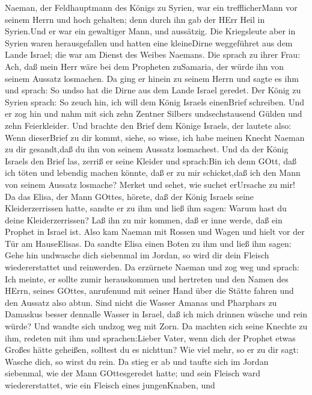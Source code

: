  Naeman, der Feldhauptmann des Königs zu Syrien, war ein
trefflicherMann vor seinem Herrn und hoch gehalten; denn durch ihn gab
der HErr Heil in Syrien.Und er war ein gewaltiger Mann, und aussätzig.
 Die Kriegsleute aber in Syrien waren herausgefallen und
hatten eine kleineDirne weggeführet aus dem Lande Israel; die war am
Dienst des Weibes Naemans.  Die sprach zu ihrer Frau: Ach,
daß mein Herr wäre bei dem Propheten zuSamaria, der würde ihn von seinem
Aussatz losmachen.  Da ging er hinein zu seinem Herrn und
sagte es ihm und sprach: So undso hat die Dirne aus dem Lande Israel
geredet.  Der König zu Syrien sprach: So zeuch hin, ich will
dem König Israels einenBrief schreiben. Und er zog hin und nahm mit sich
zehn Zentner Silbers undsechstausend Gülden und zehn Feierkleider.
 Und brachte den Brief dem Könige Israels, der lautete also:
Wenn dieserBrief zu dir kommt, siehe, so wisse, ich habe meinen Knecht
Naeman zu dir gesandt,daß du ihn von seinem Aussatz losmachest.
 Und da der König Israels den Brief las, zerriß er seine
Kleider und sprach:Bin ich denn GOtt, daß ich töten und lebendig machen
könnte, daß er zu mir schicket,daß ich den Mann von seinem Aussatz
losmache? Merket und sehet, wie suchet erUrsache zu mir!  Da
das Elisa, der Mann GOttes, hörete, daß der König Israels seine
Kleiderzerrissen hatte, sandte er zu ihm und ließ ihm sagen: Warum hast
du deine Kleiderzerrissen? Laß ihn zu mir kommen, daß er inne werde, daß
ein Prophet in Israel ist.  Also kam Naeman mit Rossen und
Wagen und hielt vor der Tür am HauseElisas.  Da sandte
Elisa einen Boten zu ihm und ließ ihm sagen: Gehe hin undwasche dich
siebenmal im Jordan, so wird dir dein Fleisch wiedererstattet und
reinwerden.  Da erzürnete Naeman und zog weg und sprach:
Ich meinte, er sollte zumir herauskommen und hertreten und den Namen des
HErrn, seines GOttes, anrufenund mit seiner Hand über die Stätte fahren
und den Aussatz also abtun.  Sind nicht die Wasser Amanas
und Pharphars zu Damaskus besser dennalle Wasser in Israel, daß ich mich
drinnen wüsche und rein würde? Und wandte sich undzog weg mit Zorn.
 Da machten sich seine Knechte zu ihm, redeten mit ihm und
sprachen:Lieber Vater, wenn dich der Prophet etwas Großes hätte
geheißen, solltest du es nichttun? Wie viel mehr, so er zu dir sagt:
Wasche dich, so wirst du rein.  Da stieg er ab und taufte
sich im Jordan siebenmal, wie der Mann GOttesgeredet hatte; und sein
Fleisch ward wiedererstattet, wie ein Fleisch eines jungenKnaben, und
